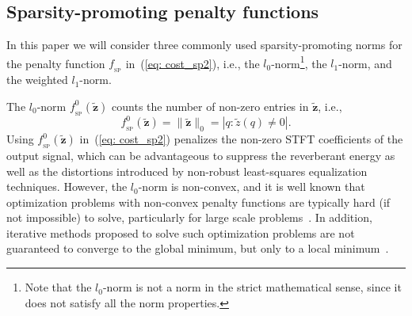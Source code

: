 \documentclass[10pt]{IEEEtran}
\begin{document}
\subsection{Sparsity-promoting penalty functions}
\label{sec: fsp}
In this paper we will consider three commonly used sparsity-promoting norms for the penalty function $f_{_{\text{SP}}}$ in~(\ref{eq: cost_sp2}), i.e., the $l_0$-norm\footnote{Note that the $l_0$-norm is not a norm in the strict mathematical sense, since it does not satisfy all the norm properties.}, the $l_1$-norm, and the weighted $l_1$-norm\cite{Natarajan_SIAM_1995,Boyd_book,Chartrand_ICASSP_2014,Candes_FA_2008}. 

The $l_0$-norm $f_{_{\text{SP}}}^0(\tilde{\mathbf{z}})$ counts the number of non-zero entries in $\tilde{\mathbf{z}}$, i.e.,
\begin{equation}
\label{eq: lo_norm}
f_{_{\text{SP}}}^0(\tilde{\mathbf{z}}) = \| \tilde{\mathbf{z}}\|_0 = |q: \tilde{z}(q) \neq 0|.
\end{equation}
Using $f_{_{\text{SP}}}^0(\tilde{\mathbf{z}})$ in~(\ref{eq: cost_sp2}) penalizes the non-zero STFT coefficients of the output signal, which can be advantageous to suppress the reverberant energy as well as the distortions introduced by non-robust least-squares equalization techniques.
However, the $l_0$-norm is non-convex, and it is well known that optimization problems with non-convex penalty functions are typically hard (if not impossible) to solve, particularly for large scale problems~\cite{Natarajan_SIAM_1995}.
In addition, iterative methods proposed to solve such optimization problems are not guaranteed to converge to the global minimum, but only to a local minimum~\cite{Nocedal_book}. 
\end{document}
